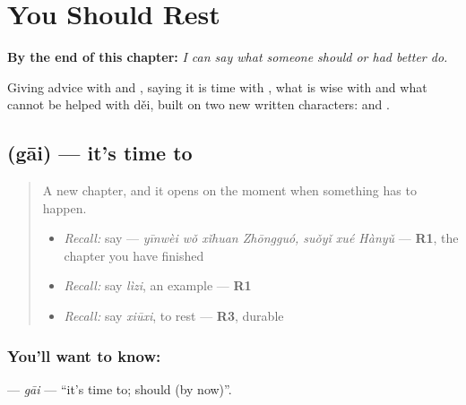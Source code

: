 
\chapter{You Should Rest}
\label{ch:zh-you-should-rest}

\begin{chapteropening}
\textbf{By the end of this chapter:} \emph{I can say what someone should or had better do.}

Giving advice with  and , saying it is time with , what is wise with  and what cannot be helped with děi, built on two new written characters:  and .
\end{chapteropening}

\section[\texorpdfstring{\zh{该} (gāi)}{该 (gāi)}]{ (gāi) — it's time to}

\label{lesson:ZH-C282-gai}



\begin{quote}
A new chapter, and it opens on the moment when something has to happen.

\begin{itemize}
\raggedright
  \item \emph{Recall:} say   — \emph{yīnwèi wǒ xǐhuan Zhōngguó, suǒyǐ xué Hànyǔ} — \textbf{R1}, the chapter you have finished
  \item \emph{Recall:} say \emph{lìzi}, an example — \textbf{R1}
  \item \emph{Recall:} say \emph{xiūxi}, to rest — \textbf{R3}, durable
\end{itemize}
\end{quote}

\subsection*{You'll want to know: }
\textbf{} — \emph{gāi} — \textquotedblleft{}it's time to; should (by now)\textquotedblright{}.

